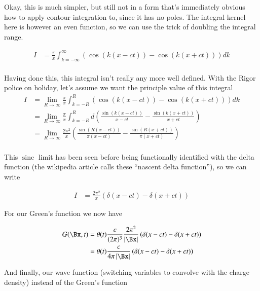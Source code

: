 \documentclass{article}
\DeclareMathOperator{\sinc}{sinc}
\begin{document}
Okay, this is much simpler, but still not in a form that's immediately obvious how to apply contour integration to, since it has no poles.
The integral
kernel here is however an even function,
so we can use the trick of doubling the integral range.

\begin{align*}
I &= \frac{\pi }{x} \int_{k=-\infty}^\infty \left( \cos\left( k (x-c t) \right) -\cos\left( k (x+c t) \right) \right) dk \\
\end{align*}

Having done this, this integral isn't really any more well defined.  With the Rigor police on holiday, let's assume we want the
principle value of this integral
\begin{align*}
I
&= \lim_{R \rightarrow \infty} \frac{\pi }{x} \int_{k=-R}^R \left( \cos\left( k (x-c t) \right) -\cos\left( k (x+c t) \right) \right) dk \\
&= \lim_{R \rightarrow \infty} \frac{\pi }{x} \int_{k=-R}^R d \left( \frac{\sin\left( k (x-c t) \right)}{ x - c t} - \frac{\sin\left( k (x+c t) \right)}{x + c t} \right) \\
&= \lim_{R \rightarrow \infty} \frac{2 \pi^2 }{x} \left( \frac{\sin\left( R (x-c t) \right)}{ \pi(x - c t)} - \frac{\sin\left( R (x+c t) \right)}{\pi(x + c t)} \right) \\
\end{align*}

This $\sinc$ limit has been seen before being functionally identified with the delta function (the wikipedia article calls these ``nascent delta function''), so we can write

\begin{align*}
I &= \frac{2 \pi^2 }{x} \left( \delta(x-c t) - \delta(x+c t) \right)
\end{align*}

For our Green's function we now have

\begin{align*}
G(\Bx, t)
&= \theta(t) \frac{c }{(2\pi)^3} \frac{2 \pi^2 }{\Abs{\Bx}} \left( \delta(x-c t) - \delta(x+c t) \right) \\
&= \theta(t) \frac{c }{4\pi \Abs{\Bx}} \left( \delta(x-c t) - \delta(x+c t) \right) \\
\end{align*}

And finally, our wave function (switching variables to convolve with the charge density) instead of the Green's function
\end{document}

